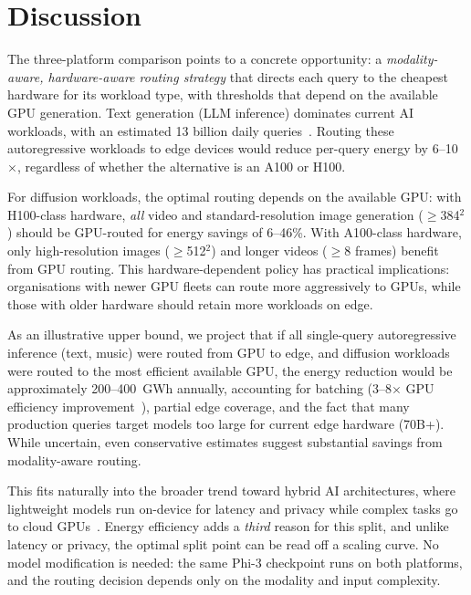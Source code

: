 \documentclass[preprint,12pt]{elsarticle}
\begin{document}
\section{Discussion}
\label{sec:discussion}

The three-platform comparison points to a concrete opportunity: a \textit{modality-aware, hardware-aware routing strategy} that directs each query to the cheapest hardware for its workload type, with thresholds that depend on the available GPU generation. Text generation (LLM inference) dominates current AI workloads, with an estimated 13 billion daily queries~\cite{devries2023growing}. Routing these autoregressive workloads to edge devices would reduce per-query energy by 6--10$\times$, regardless of whether the alternative is an A100 or H100.

For diffusion workloads, the optimal routing depends on the available GPU: with H100-class hardware, \textit{all} video and standard-resolution image generation ($\geq$384$^2$) should be GPU-routed for energy savings of 6--46\%. With A100-class hardware, only high-resolution images ($\geq$512$^2$) and longer videos ($\geq$8 frames) benefit from GPU routing. This hardware-dependent policy has practical implications: organisations with newer GPU fleets can route more aggressively to GPUs, while those with older hardware should retain more workloads on edge.

As an illustrative upper bound, we project that if all single-query autoregressive inference (text, music) were routed from GPU to edge, and diffusion workloads were routed to the most efficient available GPU, the energy reduction would be approximately 200--400~GWh annually, accounting for batching (3--8$\times$ GPU efficiency improvement~\cite{wu2022sustainable}), partial edge coverage, and the fact that many production queries target models too large for current edge hardware (70B+). While uncertain, even conservative estimates suggest substantial savings from modality-aware routing.

This fits naturally into the broader trend toward hybrid AI architectures, where lightweight models run on-device for latency and privacy while complex tasks go to cloud GPUs~\cite{xu2024edge}. Energy efficiency adds a \textit{third} reason for this split, and unlike latency or privacy, the optimal split point can be read off a scaling curve. No model modification is needed: the same Phi-3 checkpoint runs on both platforms, and the routing decision depends only on the modality and input complexity.
\end{document}
